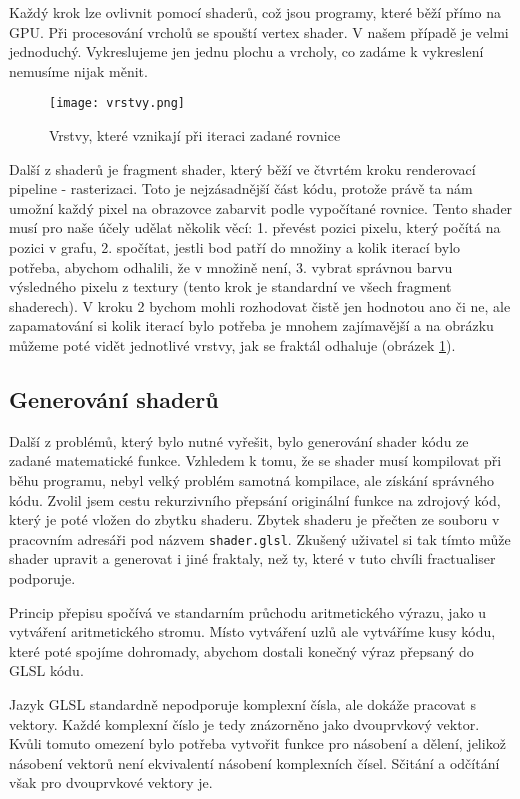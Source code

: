 Každý krok lze ovlivnit pomocí shaderů, což jsou programy, které běží přímo na
GPU. Při procesování vrcholů se spouští vertex shader. V našem případě je velmi
jednoduchý. Vykreslujeme jen jednu plochu a vrcholy, co zadáme k vykreslení
nemusíme nijak měnit.

\begin{figure}[h!]
\centering
\texttt{[image: vrstvy.png]}
\caption{Vrstvy, které vznikají při iteraci zadané rovnice}
\label{fig:vrstvy}
\end{figure}

Další z shaderů je fragment shader, který běží ve čtvrtém kroku renderovací
pipeline - rasterizaci. Toto je nejzásadnější část kódu, protože právě ta nám
umožní každý pixel na obrazovce zabarvit podle vypočítané rovnice. Tento shader
musí pro naše účely udělat několik věcí: 1. převést pozici pixelu, který počítá
na pozici v grafu, 2. spočítat, jestli bod patří do množiny a kolik iterací
bylo potřeba, abychom odhalili, že v množině není, 3. vybrat správnou barvu
výsledného pixelu z textury (tento krok je standardní ve všech fragment
shaderech). V kroku 2 bychom mohli rozhodovat čistě jen hodnotou ano či ne,
ale zapamatování si kolik iterací bylo potřeba je mnohem zajímavější a na obrázku
můžeme poté vidět jednotlivé vrstvy, jak se fraktál odhaluje (obrázek \ref{fig:vrstvy}).

\subsection{Generování shaderů}
Další z problémů, který bylo nutné vyřešit, bylo generování shader kódu ze
zadané matematické funkce. Vzhledem k tomu, že se shader musí kompilovat při
běhu programu, nebyl velký problém samotná kompilace, ale získání správného
kódu. Zvolil jsem cestu rekurzivního přepsání originální funkce na zdrojový
kód, který je poté vložen do zbytku shaderu. Zbytek shaderu je přečten ze
souboru v pracovním adresáři pod názvem \texttt{shader.glsl}. Zkušený uživatel
si tak tímto může shader upravit a generovat i jiné fraktaly, než ty, které
v tuto chvíli fractualiser podporuje.

Princip přepisu spočívá ve standarním průchodu aritmetického výrazu, jako
u vytváření aritmetického stromu. Místo vytváření uzlů ale vytváříme kusy
kódu, které poté spojíme dohromady, abychom dostali konečný výraz přepsaný
do GLSL kódu.

Jazyk GLSL standardně nepodporuje komplexní čísla, ale dokáže pracovat s
vektory. Kaž\-dé komplexní číslo je tedy znázorněno jako dvouprvkový vektor.
Kvůli tomuto omezení bylo potřeba vytvořit funkce pro násobení a dělení,
jelikož násobení vektorů není ekvivalentí násobení komplexních čísel. Sčitání a
odčítání však pro dvouprvkové vektory je.

